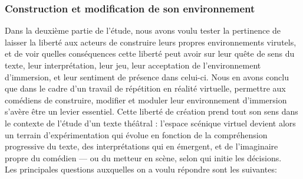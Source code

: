 \subsubsection{Construction et modification de son environnement}
Dans la deuxième partie de l'étude, nous avons voulu tester la pertinence de laisser la liberté aux acteurs de construire leurs
propres environnements virutels, et de voir quelles conséquences cette liberté peut avoir sur leur quête de sens du texte, leur interprétation,
leur jeu, leur acceptation de l'environnement d'immersion, et leur sentiment de présence dans celui-ci. Nous en avons conclu que 
dans le cadre d’un travail de répétition en réalité virtuelle, permettre aux comédiens de construire, modifier et moduler leur environnement d’immersion
s’avère être un levier essentiel. Cette liberté de création prend tout son sens dans le contexte de l’étude d’un texte théâtral : l’espace scénique 
virtuel devient alors un terrain d’expérimentation qui évolue en fonction de la compréhension progressive du texte, des interprétations qui en 
émergent, et de l’imaginaire propre du comédien — ou du metteur en scène, selon qui initie les décisions.
\\ 
Les principales questions auxquelles on a voulu répondre sont les suivantes:
